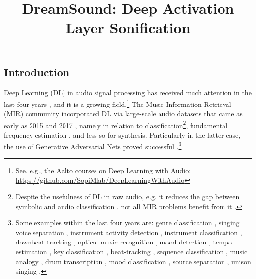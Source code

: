 \documentclass[a4paper,10pt,oneside]{article}
\title{DreamSound: Deep Activation Layer Sonification}
\begin{document}
\ninept
\maketitle

\begin{sloppy}

\begin{abstract}
\end{abstract}

\section{Introduction}
\label{sec:intro}
Deep Learning (DL) in audio signal processing \cite{2019Purwins} has received much attention in the last four years \cite{choi2017tutorial, herremans2017proceedings}, and it is a growing field.\footnote{See, e.g., the Aalto courses on Deep Learning with Audio: \url{https://github.com/SopiMlab/DeepLearningWithAudio}} 
The Music Information Retrieval (MIR) community incorporated DL via large-scale audio datasets that came as early as 2015 and 2017 \cite{2015piczak,2017audioset,engel2017neural}, namely in relation to classification\footnote{
Despite the usefulness of DL in raw audio, e.g. it reduces the gap between symbolic and audio classification \cite{sergio_oramas_2017_1417427}, not all MIR problems benefit from it \cite{harsh_verma_2019_3527866}.
}, fundamental frequency estimation \cite{rachel_m_bittner_2017_1417937,kim2018}, and less so for synthesis. Particularly in the latter case, the use of Generative Adversarial Nets proved successful \cite{Bollepalli_2017, oord2017parallel, 2017Kaneko, pascual2017segan, 2019waveglow, tian2020tfgan, Liu_2020}.\footnote{
Some examples within the last four years are: 
genre classification \cite{sergio_oramas_2017_1417427}, 
singing voice separation \cite{andreas_jansson_2017_1414934}, 
instrument activity detection \cite{siddharth_gururani_2018_1492479}, 
instrument classification \cite{juan_s_gomez_2018_1492481}, 
downbeat tracking \cite{magdalena_fuentes_2018_1492355}, 
optical music recognition \cite{lukas_tuggener_2018_1492401}, 
mood detection \cite{remi_delbouys_2018_1492427}, 
tempo estimation \cite{hadrien_foroughmand_2019_3527890},
key classification \cite{fu_zih_sing_2019_3527960}, 
beat-tracking \cite{akira_maezawa_2017_1415520,magdalena_fuentes_2019_3527792}, 
sequence classification \cite{sathwik_tejaswi_madhusudhan_2019_3527862}, 
music analogy \cite{ruihan_yang_2019_3527880}, 
drum transcription \cite{keunwoo_choi_2019_3527774}, 
mood classification \cite{filip_korzeniowski_2020_4245488}, 
source separation \cite{petermann2020deep}, 
unison singing \cite{pritish_chandna_2020_4245502},

}
\end{sloppy}
\end{document}
